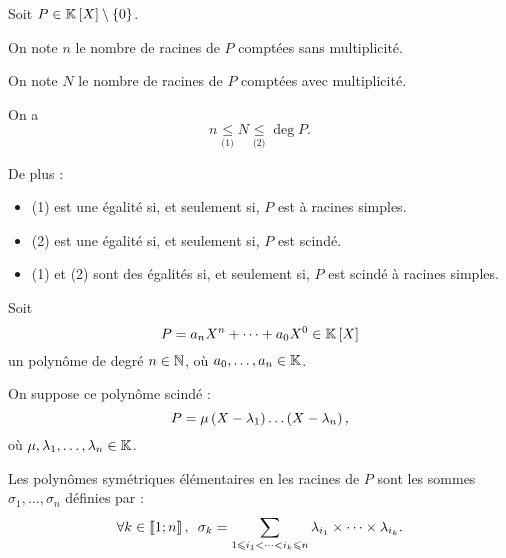 \begin{bilan}
Soit \(P\in\poly\excluant\accol{0}\).

On note \(n\) le nombre de racines de \(P\) comptées sans multiplicité.

On note \(N\) le nombre de racines de \(P\) comptées avec multiplicité.

On a \[n\underset{\text{(1)}}{\leq}N\underset{\text{(2)}}{\leq}\deg P.\]

De plus :

\begin{itemize}
\item (1) est une égalité si, et seulement si, \(P\) est à racines simples. \\

\item (2) est une égalité si, et seulement si, \(P\) est scindé. \\

\item (1) et (2) sont des égalités si, et seulement si, \(P\) est scindé à racines simples.
\end{itemize}
\end{bilan}

\begin{defi}
Soit \[P=a_nX^n+\dots+a_0X^0\in\poly\] un polynôme de degré \(n\in\mathbb{N}\), où \(a_0,\dots,a_n\in\mathbb{K}\).

On suppose ce polynôme scindé : \[P=\mu\left(X-\lambda_1\right)\dots\left(X-\lambda_n\right),\] où \(\mu,\lambda_1,\dots,\lambda_n\in\mathbb{K}\).

Les polynômes symétriques élémentaires en les racines de \(P\) sont les sommes \(\sigma_1,\dots,\sigma_n\) définies par : \[\quantifs{\forall k\in\interventierii{1}{n}}\sigma_k=\sum_{1\leq i_1<\dots<i_k\leq n}\lambda_{i_1}\times\dots\times\lambda_{i_k}.\]
\end{defi}

